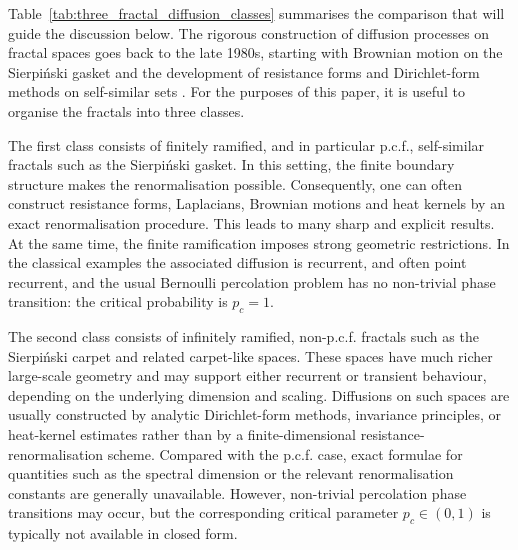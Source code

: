 \documentclass{article}
\theoremstyle{plain}
\theoremstyle{definition}
\begin{document}
Table~\ref{tab:three_fractal_diffusion_classes} summarises the comparison that will guide the discussion below.
The rigorous construction of diffusion processes on fractal spaces goes back to the late 1980s, starting with Brownian motion on the Sierpi\'nski gasket and the development of resistance forms and Dirichlet-form methods on self-similar sets
\cite{barlow1988brownian,kusuoka1989dirichlet,kigami1993harmonic,kigami2001analysis}. 
For the purposes of this paper, it is useful to organise the fractals into three classes.

The first class consists of finitely ramified, and in particular p.c.f., self-similar fractals such as the Sierpi\'nski gasket. 
In this setting, the finite boundary structure makes the renormalisation possible. 
Consequently, one can often construct resistance forms, Laplacians, Brownian motions and heat kernels by an exact renormalisation procedure. 
This leads to many sharp and explicit results. 
At the same time, the finite ramification imposes strong geometric restrictions. 
In the classical examples the associated diffusion is recurrent, and often point recurrent, and the usual Bernoulli percolation problem has no non-trivial phase transition: the critical probability is $p_c=1$.

The second class consists of infinitely ramified, non-p.c.f. fractals such as the Sierpi\'nski carpet and related carpet-like spaces. 
These spaces have much richer large-scale geometry and may support either recurrent or transient behaviour, depending on the underlying dimension and scaling. 
Diffusions on such spaces are usually constructed by analytic Dirichlet-form methods, invariance principles, or heat-kernel estimates rather than by a finite-dimensional resistance-renormalisation scheme. 
Compared with the p.c.f. case, exact formulae for quantities such as the spectral dimension or the relevant renormalisation constants are generally unavailable. 
However, non-trivial percolation phase transitions may occur, but the corresponding critical parameter $p_c\in(0,1)$ is typically not available in closed form.
\end{document}
